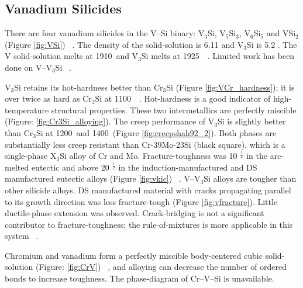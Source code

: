 \subsection{Vanadium Silicides}

There are four vanadium silicides in the V--Si binary: V$_3$Si, V$_5$Si$_3$, V$_6$Si$_5$ and VSi$_2$ (Figure \ref{fig:VSi}) ~\cite{smith90}.  The density of the solid-solution is 6.11 \gram\usk\centi\rpcubic\meter and V$_3$Si is 5.2 \gram\usk\centi\rpcubic\meter.  The V solid-solution melts at 1910\celsius\ and V$_3$Si melts at 1925\celsius\ ~\cite{freund78}.  Limited work has been done on V--V$_3$Si ~\cite{rostoker58, strum94}.

V$_3$Si retains its hot-hardness better than Cr$_3$Si (Figure \ref{fig:VCr_hardness}); it is over twice as hard as Cr$_3$Si at 1100\celsius\ ~\cite{shah92}.  Hot-hardness is a good indicator of high-temperature structural properties.  These two intermetallics are perfectly miscible (Figure: \ref{fig:Cr3Si_alloying}).  The creep performance of V$_3$Si is slightly better than Cr$_3$Si at 1200\celsius\ and 1400\celsius\ (Figure \ref{fig:creepshah92_2}).  Both phases are substantially less creep resistant than Cr-39Mo-23Si (black square), which is a single-phase X$_3$Si alloy of Cr and Mo.  Fracture-toughness was 10  \mega\pascal\m$^{\frac{1}{2}}$ in the arc-melted eutectic and above 20  \mega\pascal\m$^{\frac{1}{2}}$ in the induction-manufactured and DS manufactured eutectic alloys (Figure \ref{fig:vkic}) ~\cite{strum94}.  V--V$_3$Si alloys are tougher than other silicide alloys.  DS manufactured material with cracks propagating parallel to its growth direction was less fracture-tough (Figure \ref{fig:vfracture}).  Little ductile-phase extension was observed.  Crack-bridging is not a significant contributor to fracture-toughness; the rule-of-mixtures is more applicable in this system ~\cite{strum94}.

Chromium and vanadium form a perfectly miscible body-centered cubic solid-solution (Figure: \ref{fig:CrV}) ~\cite{kocherzhinskii85}, and alloying can decrease the number of ordered bonds to increase toughness.  The phase-diagram of Cr--V--Si is unavailable.

